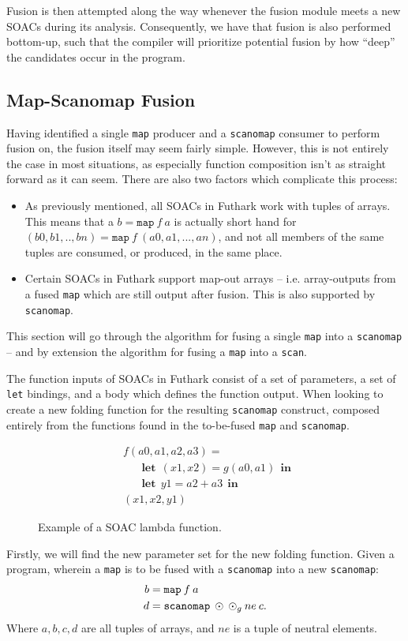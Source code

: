 \documentclass[11pt]{article}
\newcommand\lett{\phantom{-}\:\:\mathbf{let}\:\:}
\newcommand\inn{\:\:\mathbf{in}\:\:}
\begin{document}
Fusion is then attempted along the way whenever the fusion module meets a new SOACs during its analysis. Consequently, we have that fusion is also performed bottom-up, such that
 the compiler will prioritize potential fusion by how ``deep'' the candidates occur in the program.
\subsection{Map-Scanomap Fusion}
\setcounter{equation}{0}
Having identified a single \texttt{map} producer and a \texttt{scanomap} consumer to perform fusion on, the fusion itself may seem fairly simple.
 However, this is not entirely the case in most situations, as especially function composition isn't as straight forward as it can seem. There are also two factors
 which complicate this process:
 \begin{itemize}
 \item As previously mentioned, all SOACs in Futhark work with tuples of arrays. This means that a $b = \mathtt{map}\: f \: a$ is actually short hand for
$(b0, b1, .. ,bn) = \mathtt{map} \: f \: (a0, a1, ..., an)$, and not all members of the same tuples are consumed, or produced, in the same place.
 \item Certain SOACs in Futhark support map-out arrays -- i.e. array-outputs from a fused \texttt{map} which are still output after fusion. This is also
 supported by \texttt{scanomap}. 
 \end{itemize}
This section will go through the algorithm for fusing a single \texttt{map} into a \texttt{scanomap} -- and by extension the algorithm for fusing a \texttt{map} into a \texttt{scan}.

The function inputs of SOACs in Futhark consist of a set of parameters, a set of \texttt{let} bindings, and a body which defines the function output. When
 looking to create a new folding function for the resulting \texttt{scanomap} construct, composed entirely from the functions found in the to-be-fused \texttt{map} and \texttt{scanomap}.
\begin{figure}[h!]
  \centering
  \begin{align}
    &f (a0, a1, a2, a3) = \\
    &\lett (x1,x2) = g(a0, a1) \inn \\
    &\lett y1 = a2 + a3 \inn \\
    &(x1, x2, y1)
  \end{align}
  \caption{Example of a SOAC lambda function.}
\end{figure}
Firstly, we will find the new parameter set for the new folding function. Given a program, wherein a \texttt{map} is to be fused with a \texttt{scanomap} into a new \texttt{scanomap}:
\begin{align*}
b &= \mathtt{map} \: f \: a \\
d &= \mathtt{scanomap} \: \odot \: \odot_g \: ne \: c \mathnormal{.}  
\end{align*}
Where $a, b, c, d$ are all tuples of arrays, and $ne$ is a tuple of neutral elements.
\end{document}
